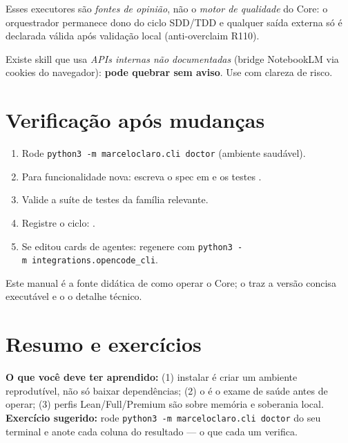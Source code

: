\begin{limite}
Esses executores são \emph{fontes de opinião}, não o \emph{motor de qualidade} do
Core: o orquestrador permanece dono do ciclo SDD/TDD e qualquer saída externa só é
declarada válida após validação local (anti-overclaim R110).
\end{limite}

\begin{aviso}
Existe skill que usa \emph{APIs internas não documentadas} (bridge NotebookLM via
cookies do navegador): \textbf{pode quebrar sem aviso}. Use com clareza de risco.
\end{aviso}

\section{Verificação após mudanças}


\begin{processo}
\begin{enumerate}[leftmargin=1.4em,itemsep=1pt]
  \item Rode \texttt{python3\ -m\ marceloclaro.cli\ doctor} (ambiente saudável).
  \item Para funcionalidade nova: escreva o spec em  e
        os testes .
  \item Valide a suíte de testes da família relevante.
  \item Registre o ciclo: .
  \item Se editou cards de agentes: regenere  com
        \texttt{python3\ -m\ integrations.opencode\_cli}.
\end{enumerate}
\end{processo}

\begin{descricao}
Este manual é a fonte didática de como operar o Core; o  traz a
versão concisa executável e o  o detalhe técnico.
\end{descricao}


\section{Resumo e exercícios}

\begin{resultado}
\textbf{O que você deve ter aprendido:} (1) instalar é criar um ambiente
reprodutível, não só baixar dependências; (2) o  é o exame de
saúde antes de operar; (3) perfis Lean/Full/Premium são sobre memória e
soberania local.
\textbf{Exercício sugerido:} rode \texttt{python3\ -m\ marceloclaro.cli\ doctor} do
seu terminal e anote cada coluna do resultado — o que cada um verifica.
\end{resultado}

